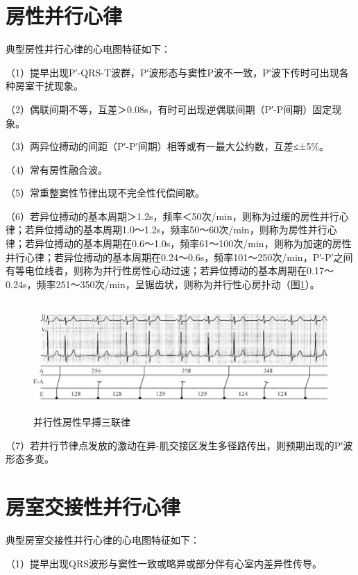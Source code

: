 \section{房性并行心律}

典型房性并行心律的心电图特征如下：

（1）提早出现P′-QRS-T波群，P′波形态与窦性P波不一致，P′波下传时可出现各种房室干扰现象。

（2）偶联间期不等，互差＞0.08s，有时可出现逆偶联间期（P′-P间期）固定现象。

（3）两异位搏动的间距（P′-P′间期）相等或有一最大公约数，互差≤±5\%。

（4）常有房性融合波。

（5）常重整窦性节律出现不完全性代偿间歇。

（6）若异位搏动的基本周期＞1.2s，频率＜50次/min，则称为过缓的房性并行心律；若异位搏动的基本周期1.0～1.2s，频率50～60次/min，则称为房性并行心律；若异位搏动的基本周期在0.6～1.0s，频率61～100次/min，则称为加速的房性并行心律；若异位搏动的基本周期在0.24～0.6s，频率101～250次/min，P′-P′之间有等电位线者，则称为并行性房性心动过速；若异位搏动的基本周期在0.17～0.24s，频率251～350次/min，呈锯齿状，则称为并行性心房扑动（图\ref{fig16-6}）。

\begin{figure}[!htbp]
 \centering
 \includegraphics[width=5.73958in,height=1.66667in]{./images/Image00282.jpg}
 \captionsetup{justification=centering}
 \caption{并行性房性早搏三联律}
 \label{fig16-6}
  \end{figure} 

（7）若并行节律点发放的激动在异-肌交接区发生多径路传出，则预期出现的P′波形态多变。

\protect\hypertarget{text00023.htmlux5cux23subid286}{}{}

\section{房室交接性并行心律}

典型房室交接性并行心律的心电图特征如下：

（1）提早出现QRS波形与窦性一致或略异或部分伴有心室内差异性传导。

